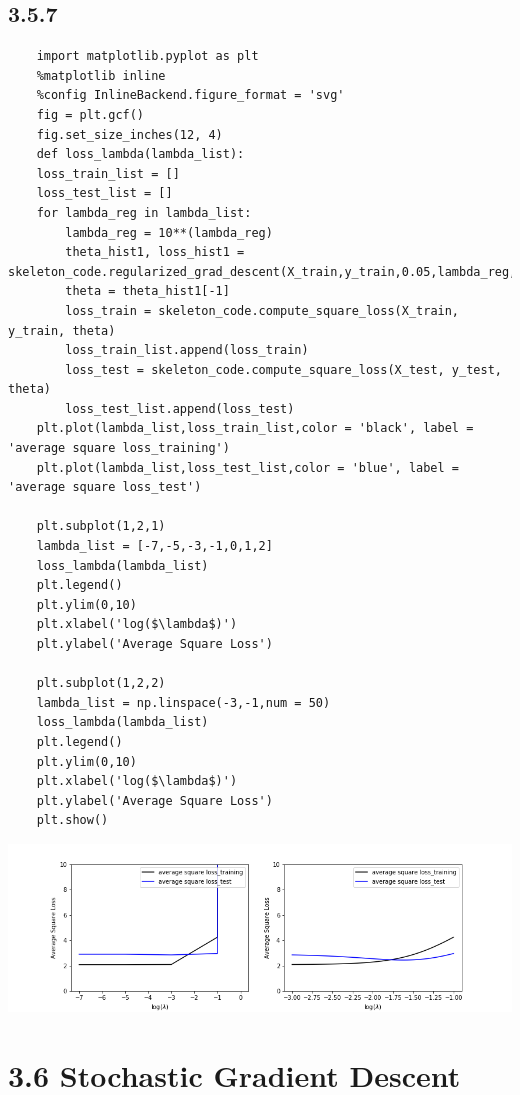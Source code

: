 \documentclass{article}
\begin{document}
\subsection{3.5.7}
\begin{verbatim}
    import matplotlib.pyplot as plt
    %matplotlib inline
    %config InlineBackend.figure_format = 'svg'
    fig = plt.gcf()
    fig.set_size_inches(12, 4)
    def loss_lambda(lambda_list):
    loss_train_list = []
    loss_test_list = []
    for lambda_reg in lambda_list:
        lambda_reg = 10**(lambda_reg)
        theta_hist1, loss_hist1 = skeleton_code.regularized_grad_descent(X_train,y_train,0.05,lambda_reg,1000)
        theta = theta_hist1[-1]
        loss_train = skeleton_code.compute_square_loss(X_train, y_train, theta) 
        loss_train_list.append(loss_train)
        loss_test = skeleton_code.compute_square_loss(X_test, y_test, theta) 
        loss_test_list.append(loss_test)
    plt.plot(lambda_list,loss_train_list,color = 'black', label = 'average square loss_training')
    plt.plot(lambda_list,loss_test_list,color = 'blue', label = 'average square loss_test')
 
    plt.subplot(1,2,1)
    lambda_list = [-7,-5,-3,-1,0,1,2]
    loss_lambda(lambda_list)
    plt.legend()
    plt.ylim(0,10)
    plt.xlabel('log($\lambda$)')
    plt.ylabel('Average Square Loss')
    
    plt.subplot(1,2,2)
    lambda_list = np.linspace(-3,-1,num = 50)
    loss_lambda(lambda_list)
    plt.legend()
    plt.ylim(0,10)
    plt.xlabel('log($\lambda$)')
    plt.ylabel('Average Square Loss')
    plt.show()
\end{verbatim}
\includegraphics[scale=0.6]{357.png}

\endsubsection

\section{3.6 Stochastic Gradient Descent}
\end{document}
